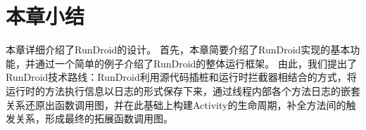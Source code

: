  \section{本章小结}

本章详细介绍了RunDroid的设计。
首先，本章简要介绍了RunDroid实现的基本功能，并通过一个简单的例子介绍了RunDroid的整体运行框架。
由此，我们提出了RunDroid技术路线：RunDroid利用源代码插桩和运行时拦截器相结合的方式，将运行时的方法执行信息以日志的形式保存下来，通过线程内部各个方法日志的嵌套关系还原出函数调用图，并在此基础上构建Activity的生命周期，补全方法间的触发关系，形成最终的拓展函数调用图。
